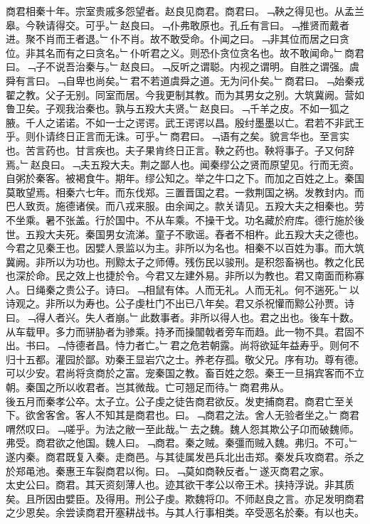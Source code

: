 \documentclass{zhvt-classic}
\begin{document}
\hspace*{2em}商君相秦十年。宗室贵戚多怨望者。赵良见商君。商君曰。﹁鞅之得见也。从孟兰皋。今鞅请得交。可乎。﹂赵良曰。﹁仆弗敢原也。孔丘有言曰。﹁推贤而戴者进。聚不肖而王者退。﹂仆不肖。故不敢受命。仆闻之曰。﹁非其位而居之曰贪位。非其名而有之曰贪名。﹂仆听君之义。则恐仆贪位贪名也。故不敢闻命。﹂商君曰。﹁子不说吾治秦与。﹂赵良曰。﹁反听之谓聪。内视之谓明。自胜之谓强。虞舜有言曰。﹁自卑也尚矣。﹂君不若道虞舜之道。无为问仆矣。﹂商君曰。﹁始秦戎翟之教。父子无别。同室而居。今我更制其教。而为其男女之别。大筑冀阙。营如鲁卫矣。子观我治秦也。孰与五羖大夫贤。﹂赵良曰。﹁千羊之皮。不如一狐之腋。千人之诺诺。不如一士之谔谔。武王谔谔以昌。殷纣墨墨以亡。君若不非武王乎。则仆请终日正言而无诛。可乎。﹂商君曰。﹁语有之矣。貌言华也。至言实也。苦言药也。甘言疾也。夫子果肯终日正言。鞅之药也。鞅将事子。子又何辞焉。﹂赵良曰。﹁夫五羖大夫。荆之鄙人也。闻秦缪公之贤而原望见。行而无资。自粥於秦客。被褐食牛。期年。缪公知之。举之牛口之下。而加之百姓之上。秦国莫敢望焉。相秦六七年。而东伐郑。三置晋国之君。一救荆国之祸。发教封内。而巴人致贡。施德诸侯。而八戎来服。由余闻之。款关请见。五羖大夫之相秦也。劳不坐乘。暑不张盖。行於国中。不从车乘。不操干戈。功名藏於府库。德行施於後世。五羖大夫死。秦国男女流涕。童子不歌谣。舂者不相杵。此五羖大夫之德也。今君之见秦王也。因嬖人景监以为主。非所以为名也。相秦不以百姓为事。而大筑冀阙。非所以为功也。刑黥太子之师傅。残伤民以骏刑。是积怨畜祸也。教之化民也深於命。民之效上也捷於令。今君又左建外易。非所以为教也。君又南面而称寡人。日绳秦之贵公子。诗曰。﹁相鼠有体。人而无礼。人而无礼。何不遄死。﹂以诗观之。非所以为寿也。公子虔杜门不出已八年矣。君又杀祝懽而黥公孙贾。诗曰。﹁得人者兴。失人者崩。﹂此数事者。非所以得人也。君之出也。後车十数。从车载甲。多力而骈胁者为骖乘。持矛而操闟戟者旁车而趋。此一物不具。君固不出。书曰。﹁恃德者昌。恃力者亡。﹂君之危若朝露。尚将欲延年益寿乎。则何不归十五都。灌园於鄙。劝秦王显岩穴之士。养老存孤。敬父兄。序有功。尊有德。可以少安。君尚将贪商於之富。宠秦国之教。畜百姓之怨。秦王一旦捐宾客而不立朝。秦国之所以收君者。岂其微哉。亡可翘足而待。﹂商君弗从。\\
\hspace*{2em}後五月而秦孝公卒。太子立。公子虔之徒告商君欲反。发吏捕商君。商君亡至关下。欲舍客舍。客人不知其是商君也。曰。﹁商君之法。舍人无验者坐之。﹂商君喟然叹曰。﹁嗟乎。为法之敝一至此哉。﹂去之魏。魏人怨其欺公子卬而破魏师。弗受。商君欲之他国。魏人曰。﹁商君。秦之贼。秦彊而贼入魏。弗归。不可。﹂遂内秦。商君既复入秦。走商邑。与其徒属发邑兵北出击郑。秦发兵攻商君。杀之於郑黾池。秦惠王车裂商君以徇。曰。﹁莫如商鞅反者。﹂遂灭商君之家。\\
\hspace*{2em}太史公曰。商君。其天资刻薄人也。迹其欲干孝公以帝王术。挟持浮说。非其质矣。且所因由嬖臣。及得用。刑公子虔。欺魏将卬。不师赵良之言。亦足发明商君之少恩矣。余尝读商君开塞耕战书。与其人行事相类。卒受恶名於秦。有以也夫。\\
\end{document}
